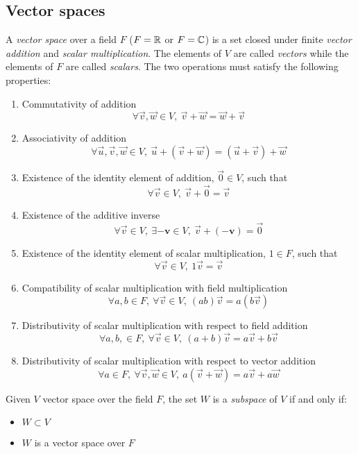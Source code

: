 \subsection{Vector spaces }

\begin{definition}
    A \textit{vector space} over a field $F$ ($F = \mathbb{R}$ or $F = \mathbb{C}$) is a set closed under finite \textit{vector addition} and \textit{scalar multiplication}. The elements of $V$ are called \textit{vectors} while the elements of $F$ are called \textit{scalars}. The two operations must satisfy the following properties:
    
    \begin{enumerate}
        \item Commutativity of addition
        $$ \forall \vec{v}, \vec{w} \in V,\ \vec{v} + \vec{w} = \vec{w} + \vec{v} $$
        \item Associativity of addition
        $$ \forall \vec{u}, \vec{v}, \vec{w} \in V,\ \vec{u} + (\vec{v} + \vec{w}) = (\vec{u} + \vec{v}) + \vec{w}$$
        \item Existence of the identity element of addition, $\vec{0} \in V$, such that
        $$ \forall \vec{v} \in V,\ \vec{v} + \vec{0} = \vec{v} $$
        \item Existence of the additive inverse
        $$ \forall \vec{v} \in V,\ \exists \mathbf{-v} \in V,\ \vec{v} + (\mathbf{-v}) = \vec{0} $$
        \item Existence of the identity element of scalar multiplication, $1 \in F$, such that
        $$ \forall \vec{v} \in V,\ 1\vec{v} = \vec{v} $$
        \item Compatibility of scalar multiplication with field multiplication
        $$ \forall a, b \in F,\ \forall \vec{v} \in V,\ (ab)\vec{v} = a(b\vec{v}) $$
        \item Distributivity of scalar multiplication with respect to field addition
        $$ \forall a, b, \in F,\ \forall \vec{v} \in V,\ (a + b)\vec{v} = a\vec{v} + b\vec{v} $$
        \item Distributivity of scalar multiplication with respect to vector addition
        $$ \forall a \in F,\ \forall \vec{v}, \vec{w} \in V,\ a(\vec{v} + \vec{w}) = a\vec{v} + a\vec{w} $$
    \end{enumerate}
\end{definition}



\begin{definition}
    Given $V$ vector space over the field $F$, the set $W$ is a \textit{subspace} of $V$ if and only if:
    \begin{itemize}
        \item $W \subset V$
        \item $W$ is a vector space over $F$
    \end{itemize}
\end{definition}


